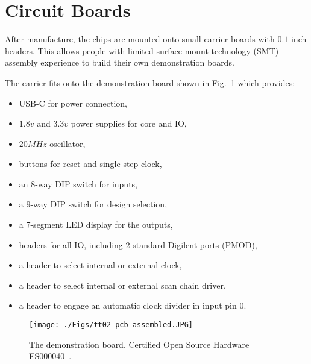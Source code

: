 \section{Circuit Boards}
\label{sec:circuit_board}
After manufacture, the chips are mounted onto small carrier boards with \(0.1\) inch headers. This allows people with limited surface mount technology (SMT) assembly experience to build their own demonstration boards.

The carrier fits onto the demonstration board shown in Fig.~\ref{fig:demonstration_board} which provides:
\begin{itemize}
\item USB-C for power connection,
\item \(1.8v\) and \(3.3v\) power supplies for core and IO,
\item \(20MHz\) oscillator,
\item buttons for reset and single-step clock,
\item an 8-way DIP switch for inputs,
\item a 9-way DIP switch for design selection,
\item a 7-segment LED display for the outputs,
\item headers for all IO, including 2 standard Digilent ports (PMOD),
\item a header to select internal or external clock,
\item a header to select internal or external scan chain driver,
\item a header to engage an automatic clock divider in input pin 0.
\end{itemize}

\begin{figure}[htp]
\centering
\texttt{[image: ./Figs/tt02 pcb assembled.JPG]}
\caption{The demonstration board. Certified Open Source Hardware ES000040~\cite{oshwacertification}.}
\label{fig:demonstration_board}
\end{figure}
